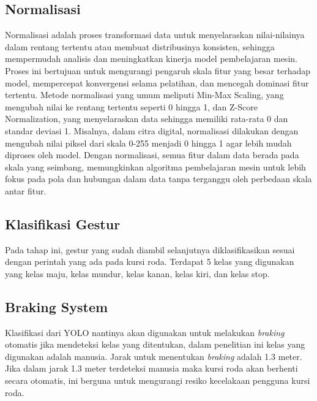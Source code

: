 \subsection{Normalisasi}
Normalisasi adalah proses transformasi data untuk menyelaraskan nilai-nilainya dalam rentang tertentu atau membuat distribusinya konsisten, sehingga mempermudah analisis dan meningkatkan kinerja model pembelajaran mesin. Proses ini bertujuan untuk mengurangi pengaruh skala fitur yang besar terhadap model, mempercepat konvergensi selama pelatihan, dan mencegah dominasi fitur tertentu. Metode normalisasi yang umum meliputi Min-Max Scaling, yang mengubah nilai ke rentang tertentu seperti 0 hingga 1, dan Z-Score Normalization, yang menyelaraskan data sehingga memiliki rata-rata 0 dan standar deviasi 1. Misalnya, dalam citra digital, normalisasi dilakukan dengan mengubah nilai piksel dari skala 0-255 menjadi 0 hingga 1 agar lebih mudah diproses oleh model. Dengan normalisasi, semua fitur dalam data berada pada skala yang seimbang, memungkinkan algoritma pembelajaran mesin untuk lebih fokus pada pola dan hubungan dalam data tanpa terganggu oleh perbedaan skala antar fitur.

\subsection{Klasifikasi Gestur}
Pada tahap ini, gestur yang sudah diambil selanjutnya diklasifikasikan sesuai dengan perintah yang ada pada kursi roda. Terdapat 5 kelas yang digunakan yang kelas maju, kelas mundur, kelas kanan, kelas kiri, dan kelas stop.

\subsection{Braking System}
Klasifikasi dari YOLO nantinya akan digunakan untuk melakukan \emph{braking} otomatis jika mendeteksi kelas yang ditentukan, dalam penelitian ini kelas yang digunakan adalah manusia. Jarak untuk menentukan \emph{braking} adalah 1.3 meter. Jika dalam jarak 1.3 meter terdeteksi manusia maka kursi roda akan berhenti secara otomatis, ini berguna untuk mengurangi resiko kecelakaan pengguna kursi roda.
